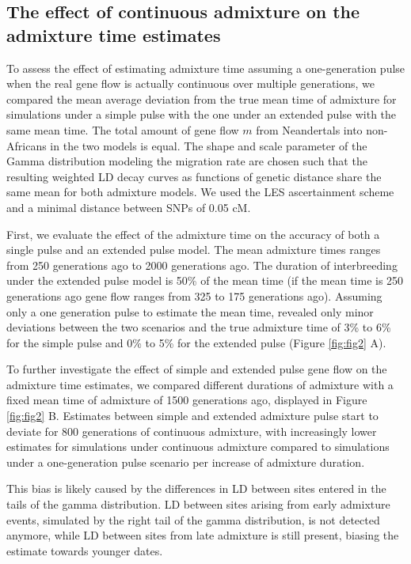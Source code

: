 \documentclass[]{article}
\begin{document}
\subsection{The effect of continuous admixture on the admixture time estimates}\label{the effect of continuous admixture on the admixture time estimates}


To assess the effect of estimating admixture time assuming a one-generation pulse when the real gene flow is actually continuous over multiple generations,
we compared the mean average deviation from the true mean time of admixture for simulations under a simple pulse with the one under an extended pulse with the same mean time.
The total amount of gene flow \(m\) from Neandertals into non-Africans
in the two models is equal. 
The shape and scale parameter of the Gamma distribution modeling the migration rate are chosen such
that the resulting weighted LD decay curves as functions of genetic
distance share the same mean for both admixture models. We used the LES ascertainment scheme and a minimal distance between SNPs of 0.05 cM. 

First, we evaluate the effect of the admixture time on the accuracy of both a single pulse and an extended pulse model. The mean admixture times ranges
from 250 generations ago to 2000 generations ago.  The duration
of interbreeding under the extended pulse model is 50\% of the mean time (if the
mean time is 250 generations ago gene flow ranges from 325 to 175
generations ago). Assuming only a one generation pulse to estimate the
mean time, revealed only minor deviations between the two scenarios and
the true admixture time of 3\% to 6\% for the simple pulse and 0\% to 5\% for
the extended pulse (Figure \ref{fig:fig2} A).



To
further investigate the effect of simple and extended pulse gene flow on the
admixture time estimates, we compared different durations of 
admixture with a fixed mean time of admixture of 1500
generations ago, displayed in Figure \ref{fig:fig2} B. Estimates between
simple and extended admixture pulse start to deviate for 800 generations of
continuous admixture, with increasingly lower estimates for simulations
under continuous admixture compared to simulations under a one-generation pulse scenario per increase of admixture duration.

This bias is likely caused
by the differences in LD between sites entered in the tails of the gamma
distribution. LD between sites arising from early admixture events,
simulated by the right tail of the gamma distribution, is not detected
anymore, while LD between sites from late admixture is still present,
biasing the estimate towards younger dates. 
\end{document}
